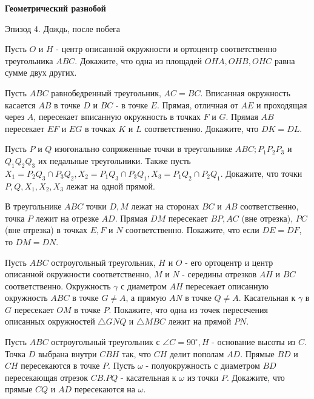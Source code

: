 \centerline{\bf \Huge Геометрический разнобой}

\begin{flushright}
        \scriptsize{Эпизод 4. Дождь, после побега}
\end{flushright}

Пусть $O$ и $H$ - центр описанной окружности и ортоцентр соответственно треугольника $A B C$. Докажите, что одна из площадей $O H A, O H B, O H C$ равна сумме двух других.

Пусть $A B C$ равнобедренный треугольник, $A C=B C$. Вписанная окружность касается $A B$ в точке $D$ и $B C$ - в точке $E$. Прямая, отличная от $A E$ и проходящая через $A$, пересекает вписанную окружность в точках $F$ и $G$. Прямая $A B$ пересекает $E F$ и $E G$ в точках $K$ и $L$ соответственно. Докажите, что $D K=D L$.

Пусть $P$ и $Q$ изогонально сопряженные точки в треугольнике $A B C ; P_1 P_2 P_3$ и $Q_1 Q_2 Q_3$ их педальные треугольники. Также пусть $X_1=P_2 Q_3 \cap P_3 Q_2, X_2=P_1 Q_3 \cap P_3 Q_1, X_3= P_1 Q_2 \cap P_2 Q_1$. Докажите, что точки $P, Q, X_1, X_2, X_3$ лежат на одной прямой.

В треугольнике $A B C$ точки $D, M$ лежат на сторонах $B C$ и $A B$ соответственно, точка $P$ лежит на отрезке $A D$. Прямая $D M$ пересекает $B P, A C$ (вне отрезка), $P C$ (вне отрезка) в точках $E, F$ и $N$ соответственно. Покажите, что если $D E=D F$, то $D M=D N$.

Пусть $A B C$ остроугольный треугольник, $H$ и $O$ - его ортоцентр и центр описанной окружности соответственно, $M$ и $N$ - середины отрезков $A H$ и $B C$ соответственно. Окружность $\gamma$ с диаметром $A H$ пересекает описанную окружность $A B C$ в точке $G \neq A$, а прямую $A N$ в точке $Q \neq A$. Касательная к $\gamma$ в $G$ пересекает $O M$ в точке $P$. Покажите, что одна из точек пересечения описанных окружностей $\triangle G N Q$ и $\triangle M B C$ лежит на прямой $P N$.

Пусть $A B C$ остроугольный треугольник с $\angle C=90^{\circ}, H$ - основание высоты из $C$. Точка $D$ выбрана внутри $C B H$ так, что $C H$ делит пополам $A D$. Прямые $B D$ и $C H$ пересекаются в точке $P$. Пусть $\omega$ - полуокружность с диаметром $B D$ пересекающая отрезок $C B . P Q$ - касательная к $\omega$ из точки $P$. Докажите, что прямые $C Q$ и $A D$ пересекаются на $\omega$.